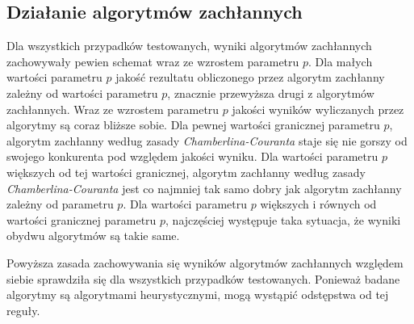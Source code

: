 \documentclass[pdflatex,11pt]{../aghdoc_version2}
\begin{document}
\subsection{Działanie algorytmów zachłannych}
Dla wszystkich przypadków testowanych, wyniki algorytmów zachłannych zachowywały pewien schemat wraz ze wzrostem parametru $p$. Dla małych wartości parametru $p$ jakość rezultatu obliczonego przez algorytm zachłanny zależny od wartości parametru $p$, znacznie przewyższa drugi z algorytmów zachłannych. Wraz ze wzrostem parametru $p$ jakości wyników wyliczanych przez algorytmy są coraz bliższe sobie. Dla pewnej wartości granicznej parametru $p$, algorytm zachłanny według zasady
\textit{Chamberlina-Couranta} staje się nie gorszy od swojego konkurenta pod względem jakości
wyniku. Dla wartości parametru $p$ większych od tej wartości granicznej, algorytm zachłanny według zasady
\textit{Chamberlina-Couranta} jest co najmniej tak samo dobry jak algorytm zachłanny zależny od
parametru $p$. Dla wartości parametru $p$ większych i równych od wartości granicznej parametru $p$, najczęściej występuje taka sytuacja, że wyniki obydwu algorytmów są takie same.

Powyższa zasada zachowywania się wyników algorytmów zachłannych względem siebie sprawdziła się dla wszystkich przypadków testowanych. Ponieważ badane algorytmy są algorytmami heurystycznymi, mogą wystąpić odstępstwa od tej reguły.
\end{document}
